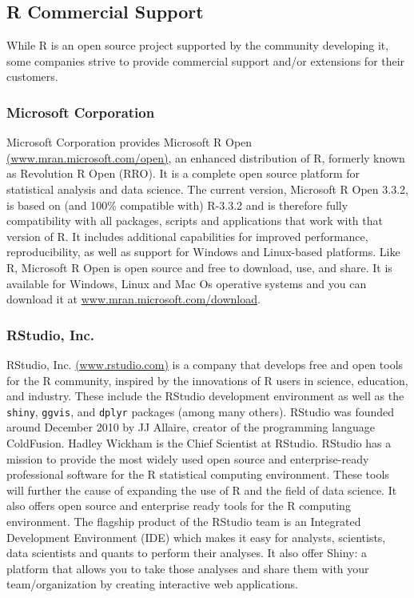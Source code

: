 \documentclass[]{book}
\begin{document}
\subsection{R Commercial Support}\label{r-commercial-support}

While R is an open source project supported by the community developing
it, some companies strive to provide commercial support and/or
extensions for their customers.

\subsubsection{Microsoft Corporation}\label{microsoft-corporation}

Microsoft Corporation provides Microsoft R Open
\href{https://mran.microsoft.com/open/}{(www.mran.microsoft.com/open)},
an enhanced distribution of R, formerly known as Revolution R Open
(RRO). It is a complete open source platform for statistical analysis
and data science. The current version, Microsoft R Open 3.3.2, is based
on (and 100\% compatible with) R-3.3.2 and is therefore fully
compatibility with all packages, scripts and applications that work with
that version of R. It includes additional capabilities for improved
performance, reproducibility, as well as support for Windows and
Linux-based platforms. Like R, Microsoft R Open is open source and free
to download, use, and share. It is available for Windows, Linux and Mac
Os operative systems and you can download it at
\href{https://mran.microsoft.com/download/}{www.mran.microsoft.com/download}.

\subsubsection{RStudio, Inc.}\label{rstudio-inc.}

RStudio, Inc. \href{http://www.rstudio.com/}{(www.rstudio.com)} is a
company that develops free and open tools for the R community, inspired
by the innovations of R users in science, education, and industry. These
include the RStudio development environment as well as the
\texttt{shiny}, \texttt{ggvis}, and \texttt{dplyr} packages (among many
others). RStudio was founded around December 2010 by JJ Allaire, creator
of the programming language ColdFusion. Hadley Wickham is the Chief
Scientist at RStudio. RStudio has a mission to provide the most widely
used open source and enterprise-ready professional software for the R
statistical computing environment. These tools will further the cause of
expanding the use of R and the field of data science. It also offers
open source and enterprise ready tools for the R computing environment.
The flagship product of the RStudio team is an Integrated Development
Environment (IDE) which makes it easy for analysts, scientists, data
scientists and quants to perform their analyses. It also offer Shiny: a
platform that allows you to take those analyses and share them with your
team/organization by creating interactive web applications.
\end{document}

